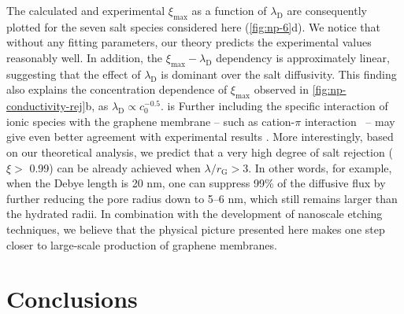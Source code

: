 %
The calculated and
experimental $\xi_{\mathrm{max}}$ as a function of
$\lambda_{\mathrm{D}}$ are consequently plotted for the seven salt
species considered here (\autoref{fig:np-6}d).  
We notice that
without any fitting parameters, our theory predicts the
experimental values reasonably well.
%
In addition, the $\xi_{\mathrm{max}}-\lambda_{\mathrm{D}}$ dependency
is approximately linear, suggesting that the effect of
$\lambda_{\mathrm{D}}$ is dominant over the salt diffusivity.
%
This
finding also explains the concentration dependence of
$\xi_{\mathrm{max}}$ observed in \autoref{fig:np-conductivity-rej}b, as
$\lambda_{\mathrm{D}} \propto c_{0}^{-0.5}$.
%
is %
Further including
the specific interaction of ionic species with the graphene membrane
-- such as cation-$\pi$ interaction~\autocite{Shi_2013_ion_enrichment} --
may give even better agreement with experimental results
\autocite{Ghosh_2018_PG_ion}.
%
More interestingly, based on our theoretical
analysis, we predict that a very high degree of salt rejection ($\xi>$
0.99) can be already achieved when $\lambda / r_{\mathrm{G}}>$3.
%
In
other words, for example, when the Debye length is 20 nm, one can
suppress 99\% of the diffusive flux by further reducing the pore
radius down to 5--6 nm, which still remains larger than the
hydrated radii.
%
In combination with the development of nanoscale
etching techniques, we believe that the physical picture presented
here makes one step closer to large-scale production of graphene
membranes.

\section{Conclusions}
\label{sec:np-conclusions}

